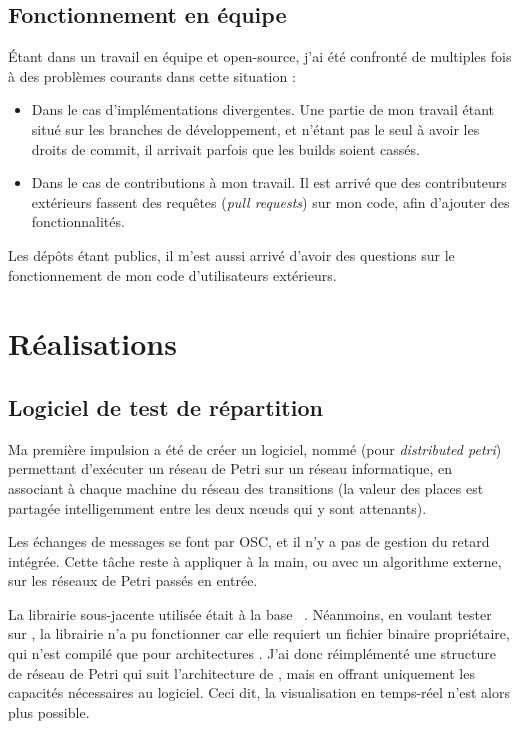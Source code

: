 \subsection{Fonctionnement en équipe}
Étant dans un travail en équipe et open-source, j'ai été confronté de multiples fois à des problèmes courants dans cette situation : 

\begin{itemize}
	\item Dans le cas d'implémentations divergentes. Une partie de mon travail étant situé sur les branches de développement, et n'étant pas le seul à avoir les droits de commit, il arrivait parfois que les builds soient cassés.
	\item Dans le cas de contributions à mon travail. Il est arrivé que des contributeurs extérieurs fassent des requêtes (\textit{pull requests}) sur mon code, afin d'ajouter des fonctionnalités.
\end{itemize}

Les dépôts étant publics, il m'est aussi arrivé d'avoir des questions sur le fonctionnement de mon code d'utilisateurs extérieurs.

\section{Réalisations}
\subsection{Logiciel de test de répartition}
Ma première impulsion a été de créer un logiciel, nommé  (pour \textit{distributed petri}) permettant d'exécuter un réseau de Petri sur un réseau informatique, en associant à chaque machine du réseau des transitions (la valeur des places est partagée intelligemment entre les deux nœuds qui y sont attenants).

Les échanges de messages se font par \ac{OSC}, et il n'y a pas de gestion du retard intégrée. Cette tâche reste à appliquer à la main, ou avec un algorithme externe, sur les réseaux de Petri passés en entrée.

La librairie sous-jacente utilisée était à la base ~\cite{lohmann2009petri}. Néanmoins, en voulant tester sur , la librairie n'a pu fonctionner car elle requiert un fichier binaire propriétaire, qui n'est compilé que pour architectures . J'ai donc réimplémenté une structure de réseau de Petri qui suit l'architecture de , mais en offrant uniquement les capacités nécessaires au logiciel. Ceci dit, la visualisation en temps-réel n'est alors plus possible.

